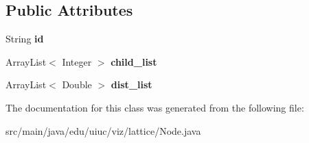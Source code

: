 \subsection*{Public Attributes}
\begin{DoxyCompactItemize}
\item 
\mbox{\label{classedu_1_1uiuc_1_1viz_1_1lattice_1_1_node_ad78ee26d8e9a4a56553ae3e923e6bb38}} 
String {\bfseries id}
\item 
\mbox{\label{classedu_1_1uiuc_1_1viz_1_1lattice_1_1_node_ac8a2d989f1f1d4af563b8527cb18b6fa}} 
Array\+List$<$ Integer $>$ {\bfseries child\+\_\+list}
\item 
\mbox{\label{classedu_1_1uiuc_1_1viz_1_1lattice_1_1_node_ac72f3418474bf2ded32995b23479f659}} 
Array\+List$<$ Double $>$ {\bfseries dist\+\_\+list}
\end{DoxyCompactItemize}


The documentation for this class was generated from the following file\+:\begin{DoxyCompactItemize}
\item 
src/main/java/edu/uiuc/viz/lattice/Node.\+java\end{DoxyCompactItemize}
